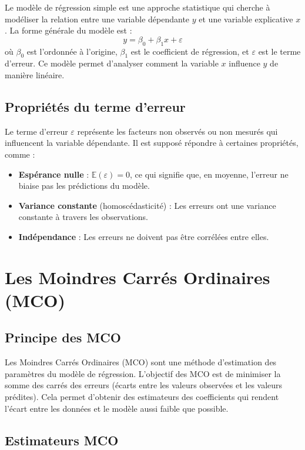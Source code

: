 \documentclass[a4paper,12pt]{article}
\begin{document}
	Le modèle de régression simple est une approche statistique qui cherche à modéliser la relation entre une variable dépendante \( y \) et une variable explicative \( x \). La forme générale du modèle est :
	\[
	y = \beta_0 + \beta_1 x + \varepsilon
	\]
	où \( \beta_0 \) est l'ordonnée à l'origine, \( \beta_1 \) est le coefficient de régression, et \( \varepsilon \) est le terme d'erreur. Ce modèle permet d'analyser comment la variable \( x \) influence \( y \) de manière linéaire.
	
	\subsection{Propriétés du terme d'erreur}
	
	Le terme d'erreur \( \varepsilon \) représente les facteurs non observés ou non mesurés qui influencent la variable dépendante. Il est supposé répondre à certaines propriétés, comme :
	\begin{itemize}
		\item \textbf{Espérance nulle} : \( \mathbb{E}(\varepsilon) = 0 \), ce qui signifie que, en moyenne, l'erreur ne biaise pas les prédictions du modèle.
		\item \textbf{Variance constante} (homoscédasticité) : Les erreurs ont une variance constante à travers les observations.
		\item \textbf{Indépendance} : Les erreurs ne doivent pas être corrélées entre elles.
	\end{itemize}
	
	\section{Les Moindres Carrés Ordinaires (MCO)}
	
	\subsection{Principe des MCO}
	
	Les Moindres Carrés Ordinaires (MCO) sont une méthode d'estimation des paramètres du modèle de régression. L'objectif des MCO est de minimiser la somme des carrés des erreurs (écarts entre les valeurs observées et les valeurs prédites). Cela permet d'obtenir des estimateurs des coefficients qui rendent l'écart entre les données et le modèle aussi faible que possible.
	
	\subsection{Estimateurs MCO}
	
\end{document}
